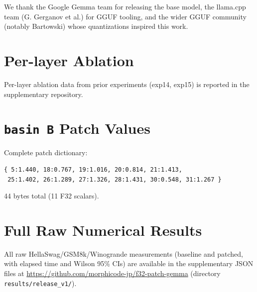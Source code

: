 \documentclass[11pt]{article}
\begin{document}
We thank the Google Gemma team for releasing the base model, the llama.cpp
team (G. Gerganov et al.) for GGUF tooling, and the wider GGUF community
(notably Bartowski) whose quantizations inspired this work.




\appendix

\section{Per-layer Ablation}
\label{app:ablation}
Per-layer ablation data from prior experiments (exp14, exp15) is reported
in the supplementary repository.

\section{\texttt{basin~B} Patch Values}
\label{app:basinb}
Complete patch dictionary:
\begin{verbatim}
{ 5:1.440, 18:0.767, 19:1.016, 20:0.814, 21:1.413,
 25:1.402, 26:1.289, 27:1.326, 28:1.431, 30:0.548, 31:1.267 }
\end{verbatim}
44 bytes total (11 F32 scalars).

\section{Full Raw Numerical Results}
\label{app:raw}
All raw HellaSwag/GSM8k/Winogrande measurements (baseline and patched, with
elapsed time and Wilson 95\% CIs) are available in the supplementary JSON
files at \url{https://github.com/morphicode-jp/f32-patch-gemma} (directory
\texttt{results/release\_v1/}).
\end{document}
